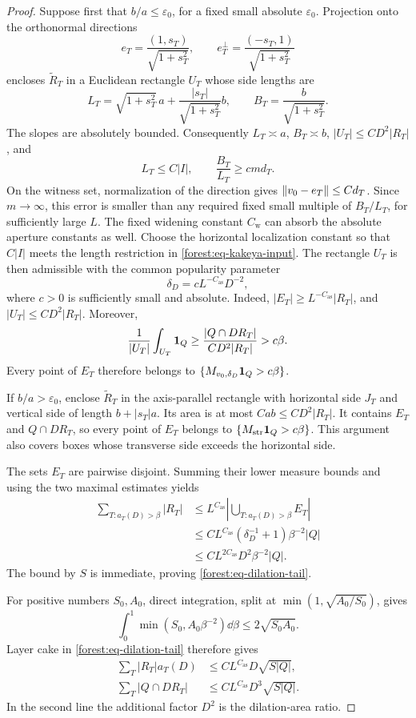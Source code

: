 \begin{proof}
Suppose first that \(b/a\le\varepsilon_0\), for a fixed small
absolute \(\varepsilon_0\). Projection onto the orthonormal
directions
\[
 e_T=\frac{(1,s_T)}{\sqrt{1+s_T^2}},\qquad
 e_T^\perp=\frac{(-s_T,1)}{\sqrt{1+s_T^2}}
\]
encloses \(\widetilde R_T\) in a Euclidean rectangle \(U_T\)
whose side lengths are
\[
 L_T=\sqrt{1+s_T^2}\,a
           +\frac{|s_T|}{\sqrt{1+s_T^2}}b,
 \qquad B_T=\frac{b}{\sqrt{1+s_T^2}}.
\]
The slopes are absolutely bounded. Consequently \(L_T\asymp a\),
\(B_T\asymp b\), \(|U_T|\le C D^2|R_T|\), and
\[
 L_T\le C|I|,\qquad \frac{B_T}{L_T}\ge c m d_T.
\]
On the witness set, normalization of the direction gives
\(\left\|v_0-e_T\right\|\le C d_T\). Since \(m\to\infty\), this
error is smaller than any required fixed small multiple of
\(B_T/L_T\), for sufficiently large \(L\). The fixed widening
constant \(C_{\mathrm{w}}\) can absorb the absolute aperture
constants as well. Choose the horizontal localization constant so
that \(C|I|\) meets the length restriction in
\eqref{forest:eq-kakeya-input}. The rectangle \(U_T\) is then
admissible with the common popularity parameter
\[
 \delta_D=c L^{-C_{\mathrm{as}}}D^{-2},
\]
where \(c>0\) is sufficiently small and absolute. Indeed,
\(|E_T|\ge L^{-C_{\mathrm{as}}}|R_T|\), and
\(|U_T|\le CD^2|R_T|\). Moreover,
\[
 \frac1{|U_T|}\int_{U_T}\mathbf 1_Q
 \ge\frac{|Q\cap DR_T|}{CD^2|R_T|}>c\beta.
\]
Every point of \(E_T\) therefore belongs to
\(\{M_{v_0,\delta_D}\mathbf 1_Q>c\beta\}\).

If \(b/a>\varepsilon_0\), enclose
\(\widetilde R_T\) in the axis-parallel rectangle with horizontal
side \(J_T\) and vertical side of length \(b+|s_T|a\).
Its area is at most \(C ab\le CD^2|R_T|\). It contains
\(E_T\) and \(Q\cap DR_T\), so every point of \(E_T\)
belongs to \(\{M_{\mathrm{str}}\mathbf 1_Q>c\beta\}\).
This argument also covers boxes whose transverse side exceeds the
horizontal side.

The sets \(E_T\) are pairwise disjoint. Summing their lower measure
bounds and using the two maximal estimates yields
\begin{align*}
 \sum_{T:a_T(D)>\beta}|R_T|
 &\le L^{C_{\mathrm{as}}}
    \left|\bigcup_{T:a_T(D)>\beta}E_T\right|\\
 &\le C L^{C_{\mathrm{as}}}
       (\delta_D^{-1}+1)\beta^{-2}|Q|\\
 &\le C L^{2C_{\mathrm{as}}}D^2\beta^{-2}|Q|.
\end{align*}
The bound by \(S\) is immediate, proving
\eqref{forest:eq-dilation-tail}.

For positive numbers \(S_0,A_0\), direct integration, split at
\(\min(1,\sqrt{A_0/S_0})\), gives
\[
 \int_0^1\min(S_0,A_0\beta^{-2})\dd\beta
        \le2\sqrt{S_0A_0}.
\]
Layer cake in \eqref{forest:eq-dilation-tail} therefore gives
\begin{align}
 \sum_T|R_T|a_T(D)
 &\le C L^{C_{\mathrm{as}}}D\sqrt{S|Q|},
       \label{forest:eq-dilation-layer}\\
 \sum_T|Q\cap DR_T|
 &\le C L^{C_{\mathrm{as}}}D^3\sqrt{S|Q|}.
       \label{forest:eq-dilated-count}
\end{align}
In the second line the additional factor \(D^2\) is the
dilation-area ratio.


\end{proof}
